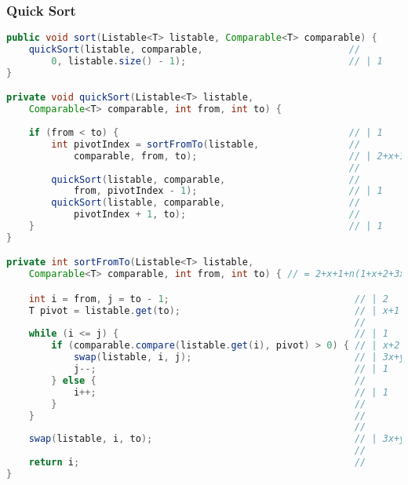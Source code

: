 \documentclass[a4paper, 11pt]{article}
\begin{document}
\pagebreak

\subsubsection*{Quick Sort}

\begin{lstlisting}[language=java]
public void sort(Listable<T> listable, Comparable<T> comparable) {
    quickSort(listable, comparable,                          //
        0, listable.size() - 1);                             // | 1
}

private void quickSort(Listable<T> listable,
    Comparable<T> comparable, int from, int to) {                                              |
                                                                                               |
    if (from < to) {                                         // | 1                            |
        int pivotIndex = sortFromTo(listable,                //                                |
            comparable, from, to);                           // | 2+x+1+n(1+x+2+3x+y+1+1)+3x+y |
                                                             //                                |
        quickSort(listable, comparable,                      //                                | log(n)
            from, pivotIndex - 1);                           // | 1                            |
        quickSort(listable, comparable,                      //                                |
            pivotIndex + 1, to);                             //                                |
    }                                                        // | 1                            |
}                                                                                              |

private int sortFromTo(Listable<T> listable,
    Comparable<T> comparable, int from, int to) { // = 2+x+1+n(1+x+2+3x+y+1+1)+3x+y

    int i = from, j = to - 1;                                 // | 2
    T pivot = listable.get(to);                               // | x+1
                                                              //
    while (i <= j) {                                          // | 1    |
        if (comparable.compare(listable.get(i), pivot) > 0) { // | x+2  |
            swap(listable, i, j);                             // | 3x+y |
            j--;                                              // | 1    | n
        } else {                                              //        |
            i++;                                              // | 1    |
        }                                                     //        |
    }                                                         //        |
                                                              //
    swap(listable, i, to);                                    // | 3x+y
                                                              //
    return i;                                                 //
}


\end{lstlisting}
\end{document}
